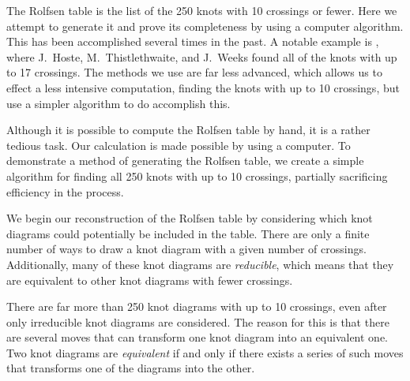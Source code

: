 \begin{paper}

The Rolfsen table is the list of the 250 knots with 10 crossings or fewer.
Here we attempt to generate it and prove its completeness by using a computer
algorithm.
This has been accomplished several times in the past.
A notable example is \cite{htw}, where J.~Hoste, M.~Thistlethwaite, and J.~Weeks
found all of the knots with up to 17 crossings.
The methods we use are far less advanced, which allows us to effect a less
intensive computation, finding the knots with up to 10 crossings, but use a
simpler algorithm to do accomplish this.

Although it is possible to compute the Rolfsen table by hand, it is a rather
tedious task.
Our calculation is made possible by using a computer.
To demonstrate a method of generating the Rolfsen table, we create a simple
algorithm for finding all 250 knots with up to 10 crossings, partially
sacrificing efficiency in the process.

We begin our reconstruction of the Rolfsen table by considering which knot
diagrams could potentially be included in the table.
There are only a finite number of ways to draw a knot diagram with a given
number of crossings.
Additionally, many of these knot diagrams are \textit{reducible}, which means
that they are equivalent to other knot diagrams with fewer crossings.

There are far more than 250 knot diagrams with up to 10 crossings, even after
only irreducible knot diagrams are considered.
The reason for this is that there are several moves that can transform one knot
diagram into an equivalent one.
Two knot diagrams are \textit{equivalent} if and only if there exists a series
of such moves that transforms one of the diagrams into the other.


\end{paper}
